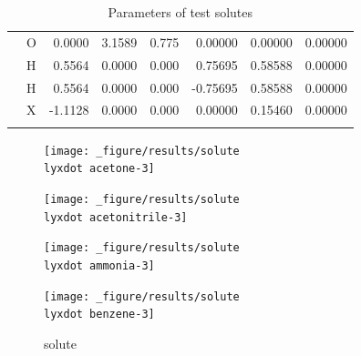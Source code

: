 \begin{table}[h]
\begin{centering}
\begin{tabular*}{1\linewidth}{@{\extracolsep{\fill}}llrrrrrr}
\addlinespace[-0.17em]
\midrule 
\addlinespace[-0.33em]
{\scriptsize{}TIP4P \citep{Abascal_2005}} & {\scriptsize{}O} & {\scriptsize{}0.0000} & {\scriptsize{}3.1589} & {\scriptsize{}0.775} & {\scriptsize{}0.00000} & {\scriptsize{}0.00000} & {\scriptsize{}0.00000}\tabularnewline
\addlinespace[-0.17em]
\addlinespace[-0.33em]
 & {\scriptsize{}H} & {\scriptsize{}0.5564} & {\scriptsize{}0.0000} & {\scriptsize{}0.000} & {\scriptsize{}0.75695} & {\scriptsize{}0.58588} & {\scriptsize{}0.00000}\tabularnewline
\addlinespace[-0.17em]
\addlinespace[-0.33em]
 & {\scriptsize{}H} & {\scriptsize{}0.5564} & {\scriptsize{}0.0000} & {\scriptsize{}0.000} & {\scriptsize{}-0.75695} & {\scriptsize{}0.58588} & {\scriptsize{}0.00000}\tabularnewline
\addlinespace[-0.17em]
\addlinespace[-0.33em]
 & {\scriptsize{}X} & {\scriptsize{}-1.1128} & {\scriptsize{}0.0000} & {\scriptsize{}0.000} & {\scriptsize{}0.00000} & {\scriptsize{}0.15460} & {\scriptsize{}0.00000}\tabularnewline
\bottomrule
\addlinespace[-0.17em]
\end{tabular*}
\par\end{centering}
\caption{Parameters of test solutes\label{tab:Parameters-of-test-solutes-2}}
\end{table}

\begin{figure}[!tbph]
\begin{centering}
\texttt{[image: \_figure/results/solute\\lyxdot acetone-3]}
\par\end{centering}
\begin{centering}
\texttt{[image: \_figure/results/solute\\lyxdot acetonitrile-3]}
\par\end{centering}
\begin{centering}
\texttt{[image: \_figure/results/solute\\lyxdot ammonia-3]}
\par\end{centering}
\begin{centering}
\texttt{[image: \_figure/results/solute\\lyxdot benzene-3]}
\par\end{centering}
\caption{solute}
\end{figure}

